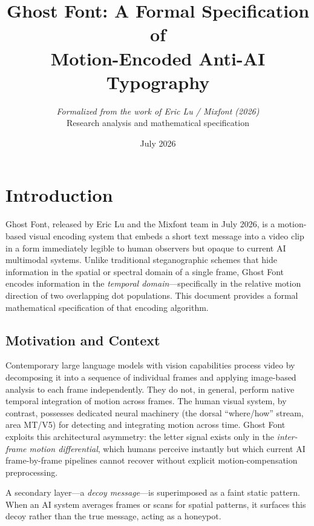 \documentclass[12pt,a4paper]{article}
\title{\textbf{Ghost Font: A Formal Specification of\\
Motion-Encoded Anti-AI Typography}}
\author{
  \textit{Formalized from the work of Eric Lu / Mixfont (2026)}\\[0.4em]
  \small Research analysis and mathematical specification
}
\date{July 2026}
\begin{document}
\maketitle
\tableofcontents
\newpage

\section{Introduction}

Ghost Font, released by Eric Lu and the Mixfont team in July 2026, is a
motion-based visual encoding system that embeds a short text message into a
video clip in a form immediately legible to human observers but opaque to
current AI multimodal systems.  Unlike traditional steganographic schemes
that hide information in the spatial or spectral domain of a single frame,
Ghost Font encodes information in the \emph{temporal domain}—specifically in
the relative motion direction of two overlapping dot populations.  This
document provides a formal mathematical specification of that encoding
algorithm.

\subsection{Motivation and Context}

Contemporary large language models with vision capabilities process video by
decomposing it into a sequence of individual frames and applying image-based
analysis to each frame independently.  They do not, in general, perform
native temporal integration of motion across frames.  The human visual
system, by contrast, possesses dedicated neural machinery (the dorsal
``where/how'' stream, area MT/V5) for detecting and integrating motion across
time.  Ghost Font exploits this architectural asymmetry: the letter signal
exists only in the \emph{inter-frame motion differential}, which humans
perceive instantly but which current AI frame-by-frame pipelines cannot
recover without explicit motion-compensation preprocessing.

A secondary layer—a \emph{decoy message}—is superimposed as a faint static
pattern.  When an AI system averages frames or scans for spatial patterns, it
surfaces this decoy rather than the true message, acting as a honeypot.

\end{document}
